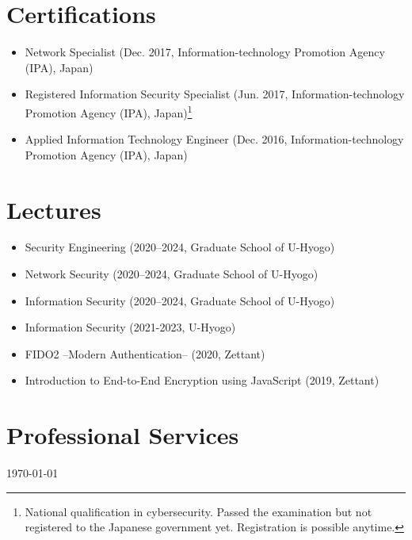 \section*{Certifications}
\begin{itemize}
\item Network Specialist (Dec. 2017, Information-technology Promotion Agency (IPA), Japan)
\item Registered Information Security Specialist (Jun. 2017, Information-technology Promotion Agency (IPA), Japan)\footnote{National qualification in cybersecurity. Passed the examination but not registered to the Japanese government yet. Registration is possible anytime.}
\item Applied Information Technology Engineer (Dec. 2016, Information-technology Promotion Agency (IPA), Japan)
\end{itemize}

\section*{Lectures}
\begin{itemize}
 \item Security Engineering (2020--2024, Graduate School of U-Hyogo)
 \item Network Security (2020--2024, Graduate School of U-Hyogo)
 \item Information Security (2020--2024, Graduate School of U-Hyogo)
 \item Information Security (2021-2023, U-Hyogo)
 \item FIDO2 –Modern Authentication– (2020, Zettant)
 \item Introduction to End-to-End Encryption using JavaScript (2019, Zettant)
\end{itemize}

\section*{Professional Services}


\bigskip

\begin{center}
  \begin{footnotesize}
   \today \\
    \href{\footerlink}{\texttt{\footerlink}}
  \end{footnotesize}
\end{center}

